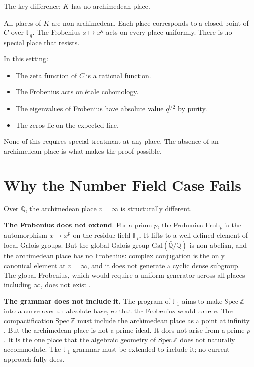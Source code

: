 \documentclass[12pt]{article}
\theoremstyle{definition}
\theoremstyle{remark}
\begin{document}
The key difference: $K$ has no archimedean place.

All places of $K$ are non-archimedean.
Each place corresponds to a closed point of $C$ over $\mathbb{F}_q$.
The Frobenius $x \mapsto x^q$ acts on every place uniformly.
There is no special place that resists.

In this setting:
\begin{itemize}
\item The zeta function of $C$ is a rational function.
\item The Frobenius acts on étale cohomology.
\item The eigenvalues of Frobenius have absolute value $q^{i/2}$ by purity.
\item The zeros lie on the expected line.
\end{itemize}

None of this requires special treatment at any place.
The absence of an archimedean place is what makes the proof possible.

\section{Why the Number Field Case Fails}

Over $\mathbb{Q}$, the archimedean place $v = \infty$ is structurally different.

\textbf{The Frobenius does not extend.}
For a prime $p$, the Frobenius $\mathrm{Frob}_p$ is the automorphism
$x \mapsto x^p$ on the residue field $\mathbb{F}_p$.
It lifts to a well-defined element of local Galois groups.
But the global Galois group $\mathrm{Gal}(\bar{\mathbb{Q}}/\mathbb{Q})$ is non-abelian,
and the archimedean place has no Frobenius:
complex conjugation is the only canonical element at $v = \infty$,
and it does not generate a cyclic dense subgroup.
The global Frobenius, which would require a uniform generator
across all places including $\infty$, does not exist \cite{frobenius}.

\textbf{The grammar does not include it.}
The program of $\mathbb{F}_1$ aims to make $\mathrm{Spec}\,\mathbb{Z}$ into a curve
over an absolute base, so that the Frobenius would cohere.
The compactification $\overline{\mathrm{Spec}\,\mathbb{Z}}$ must include the archimedean place
as a point at infinity \cite{f1}.
But the archimedean place is not a prime ideal.
It does not arise from a prime $p$.
It is the one place that the algebraic geometry of $\mathrm{Spec}\,\mathbb{Z}$
does not naturally accommodate.
The $\mathbb{F}_1$ grammar must be extended to include it;
no current approach fully does.
\end{document}
